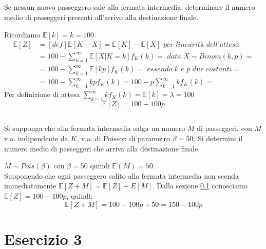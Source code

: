 \documentclass[a4paper]{article}
\newcommand{\E}[0]{\mathbb{E}}
\begin{document}
\subsection{}
\label{SEC:2.b}
Se nessun nuovo passeggero sale alla fermata intermedia, determinare il numero medio di passeggeri presenti all’arrivo alla destinazione finale.

Ricordiamo $\E[k] = k = 100$.\\
\begin{align*}
	\E[Z] &=[def] \E[K-X] = \E[K] - \E[X] \textit{ per linearità dell'attesa}\\
	      &= 100 - \sum_{k=1}^{\infty} \E[X|K=k]f_K(k)= \textit{ data $X \sim Binom(k,p)$} = \\
	      &= 100 - \sum_{k=1}^{\infty} \E[kp]f_K(k)= \textit{ essendo k e p due costanti} = \\
	      &= 100 - \sum_{k=1}^{\infty} kpf_K(k)= 100 - p\sum_{k=1}^{\infty} kf_K(k)=
\end{align*}
Per definizione di attesa $ \sum_{k=1}^{\infty} kf_K(k)= \E[k] = \lambda = 100$
$$ \E[Z] = 100 -100p$$
\subsection{}
Si supponga che alla fermata intermedia salga un numero $M$ di passeggeri, con $M$ v.a. indipendente da $K$, v.a. di Poisson di parametro $\beta = 50$. Si determini il numero medio di passeggeri che arriva alla destinazione finale.

$M \sim Pois(\beta)$ con $\beta = 50$ quindi $\E(M) = 50$.\\
Supponendo che ogni passeggero salito alla fermata intermedia non scenda immediatamente $\E[Z + M] = \E[Z] + E[M]$.
Dalla sezione \ref{SEC:2.b} conosciamo $\E[Z] = 100 -100p$, quindi:
$$\E[Z + M]= 100 -100p +50 = 150 - 100p$$
\section{Esercizio 3}
\end{document}
